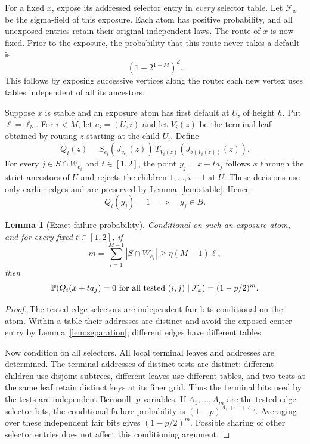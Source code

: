 \documentclass[11pt]{article}
\newtheorem{lemma}[theorem]{Lemma}
\theoremstyle{remark}\newtheorem{remark}[theorem]{Remark}
\begin{document}
For a fixed $x$, expose its addressed selector entry in \emph{every} selector table. Let $\mathcal F_x$ be the sigma-field of this exposure. Each atom has positive probability, and all unexposed entries retain their original independent laws. The route of $x$ is now fixed. Prior to the exposure, the probability that this route never takes a default is
\begin{equation}\label{eq:no-default}
 (1-2^{1-M})^d.
\end{equation}
This follows by exposing successive vertices along the route: each new vertex uses tables independent of all its ancestors.

Suppose $x$ is stable and an exposure atom has first default at $U$, of height $h$. Put $\ell=\ell_h$. For $i<M$, let $e_i=(U,i)$ and let $V_i(z)$ be the terminal leaf obtained by routing $z$ starting at the child $U_i$. Define
\[
 Q_i(z)=S_{e_i}(J_{v_{e_i}}(z))\,
 T_{V_i(z)}(J_{b(V_i(z))}(z)).
\]
For every $j\in S\cap W_{e_i}$ and $t\in[1,2]$, the point $y_j=x+t a_j$ follows $x$ through the strict ancestors of $U$ and rejects the children $1,\ldots,i-1$ at $U$. These decisions use only earlier edges and are preserved by Lemma~\ref{lem:stable}. Hence
\begin{equation}\label{eq:implication}
 Q_i(y_j)=1\quad\Longrightarrow\quad y_j\in B.
\end{equation}

\begin{lemma}[Exact failure probability]\label{lem:independence}
Conditional on such an exposure atom, and for every fixed $t\in[1,2]$, if
\[
 m=\sum_{i=1}^{M-1}|S\cap W_{e_i}|\ge\eta(M-1)\ell,
\]
then
\[
 \mathbb P(Q_i(x+t a_j)=0\text{ for all tested }(i,j)\mid\mathcal F_x)
 =(1-p/2)^m.
\]
\end{lemma}
\begin{proof}
The tested edge selectors are independent fair bits conditional on the atom. Within a table their addresses are distinct and avoid the exposed center entry by Lemma~\ref{lem:separation}; different edges have different tables.

Now condition on all selectors. All local terminal leaves and addresses are determined. The terminal addresses of distinct tests are distinct: different children use disjoint subtrees, different leaves use different tables, and two tests at the same leaf retain distinct keys at its finer grid. Thus the terminal bits used by the tests are independent Bernoulli-$p$ variables. If $A_1,\ldots,A_m$ are the tested edge selector bits, the conditional failure probability is $(1-p)^{A_1+\cdots+A_m}$. Averaging over these independent fair bits gives $(1-p/2)^m$. Possible sharing of other selector entries does not affect this conditioning argument.
\end{proof}
\end{document}
